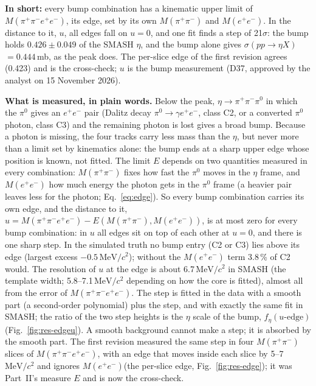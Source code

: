 \documentclass[11pt,a4paper]{article}
\newcommand{\piz}{\ensuremath{\pi^{0}}\xspace}
\newcommand{\ee}{\ensuremath{e^{+}e^{-}}\xspace}
\newcommand{\pipi}{\ensuremath{\pi^{+}\pi^{-}}\xspace}
\newcommand{\Mfour}{\ensuremath{M(\pi^{+}\pi^{-}e^{+}e^{-})}\xspace}
\newcommand{\Mee}{\ensuremath{M(e^{+}e^{-})}\xspace}
\newcommand{\Mpipi}{\ensuremath{M(\pi^{+}\pi^{-})}\xspace}
\newcommand{\MeVcc}{\ensuremath{\mathrm{MeV}/c^{2}}\xspace}
\newcommand{\sigeta}{\ensuremath{\sigma(pp\to\eta X)}\xspace}
\begin{document}
\textbf{In short:} every bump combination has a kinematic upper limit of \Mfour, its edge, set by its own \Mpipi and \Mee. In the distance to
it, $u$, all edges fall on $u=0$, and one fit finds a step of 21$\sigma$: the bump holds $0.426\pm0.049$ of the SMASH $\eta$, and the bump alone
gives \sigeta $=0.444$\,mb, as the peak does. The per-slice edge of the first revision agrees (0.423) and is the cross-check; $u$ is the bump
measurement (D37, approved by the analyst on 15 November 2026).

\textbf{What is measured, in plain words.} Below the peak, $\eta\to\pipi\piz$ in which the \piz gives an \ee pair (Dalitz decay
$\piz\to\gamma\ee$, class C2, or a converted \piz photon, class C3) and the remaining photon is lost gives a broad bump. Because a photon is
missing, the four tracks carry less mass than the $\eta$, but never more than a limit set by kinematics alone: the bump ends at a sharp upper
edge whose position is known, not fitted. The limit $E$ depends on two quantities measured in every combination: \Mpipi fixes how fast the \piz moves
in the $\eta$ frame, and \Mee how much energy the photon gets in the \piz frame (a heavier pair leaves less for the photon; Eq.~\ref{eq:edge}).
So every bump combination carries its own edge, and the distance to it, $u=\Mfour-E(\Mpipi,\Mee)$, is at most zero for every bump combination: in $u$
all edges sit on top of each other at $u=0$, and there is one sharp step. In the simulated truth no bump entry (C2 or C3) lies above its edge (largest
excess $-0.5$\,\MeVcc); without the \Mee term 3.8\,\% of C2 would. The resolution of $u$ at the edge is about 6.7\,\MeVcc in SMASH (the
template width; 5.8--7.1\,\MeVcc depending on how the core is fitted), almost all from the error of \Mfour. The step is fitted in the data with
a smooth part (a second-order polynomial) plus the step, and with exactly the same fit in SMASH; the ratio of the two step heights is the
$\eta$ scale of the bump, $f_\eta(u\text{-edge})$ (Fig.~\ref{fig:res-edgeu}). A smooth background cannot make a step; it is absorbed by the
smooth part. The first revision measured the same step in four \Mpipi slices of \Mfour, with an edge that moves inside each slice by 5--7\,\MeVcc
and ignores \Mee (the per-slice edge, Fig.~\ref{fig:res-edge}); it was Part~II's measure $E$ and is now the cross-check.
\end{document}
